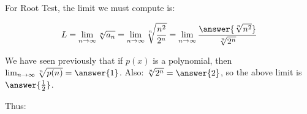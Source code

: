 \documentclass{ximera}
\begin{document}
\begin{exercise}
\begin{hint}
\begin{question}
For Root Test, the limit we must compute is:

\[
L = \lim_{n \to \infty} \sqrt[n]{a_n} =\lim_{n \to \infty} \sqrt[n]{\frac{n^2}{2^n}} = \lim_{n \to \infty} \frac{\answer{\sqrt[n]{n^2}}}{\sqrt[n]{2^n}}
\]

We have seen previously that if $p(x)$ is a polynomial, then $\lim_{n \to \infty} \sqrt[n]{p(n)} = \answer{1}$.  Also: $\sqrt[n]{2^n} = \answer{2}$, so the above limit is $\answer{\frac{1}{2}}$.

Thus:
\begin{multipleChoice}
\end{multipleChoice}

\end{question}


\end{hint}

\end{exercise}
\end{document}
